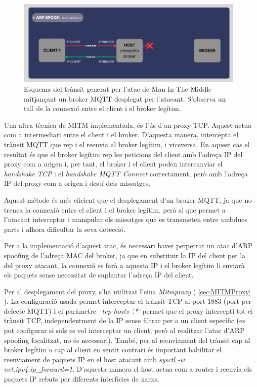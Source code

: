   \begin{figure}[H]
    \centering
    \includegraphics[width=1\textwidth]{img/mitmbroker.png}
    \caption{Esquema del trànsit generat per l'atac de Man In The Middle mitjançant un broker MQTT desplegat per l'atacant. S'observa un tall de la connexió entre el client i el broker legítim.}
    \label{fig:MITMbroker}
  \end{figure}

Una altra tècnica de MITM implementada, és l'ús d'un proxy TCP. Aquest actua com a intermediari entre el client i el broker. D'aquesta manera, intercepta el trànsit MQTT que rep i el reenvia al broker legítim, i viceversa. En aquest cas el resultat és que el broker legítim rep les peticions del client amb l'adreça IP del proxy com a origen i, per tant, el broker i el client poden intercanviar el \textit{handshake TCP} i el \textit{handshake MQTT Connect} correctament, però amb l'adreça IP del proxy com a origen i destí dels missatges.

Aquest mètode és més eficient que el desplegament d'un broker MQTT, ja que no trenca la connexió entre el client i el broker legítim, però sí que permet a l'atacant interceptar i manipular els missatges que es transmeten entre ambdues parts i alhora dificultar la seva detecció. 

Per a la implementació d'aquest atac, és necessari haver perpetrat un atac d'ARP spoofing de l'adreça MAC del broker, ja que en substituir la IP del client per la del proxy atacant, la connexió es farà a aquesta IP i el broker legítim li enviarà els paquets sense necessitat de suplantar l'adreça IP del client.

Per al desplegament del proxy, s'ha utilitzat l'eina \textit{Mitmproxy} ( \ref{sec:MITMProxy} ). La configuració usada permet interceptar el trànsit TCP al port 1883 (port per defecte MQTT) i el paràmetre \textit{--tcp-hosts '.*'} permet que el proxy intercepti tot el trànsit TCP, independentment de la IP sense filtrar per a un client específic (es pot configurar si sols es vol interceptar un client, però al realitzar l'atac d'ARP spoofing focalitzat, no és necessari). També, per al reenviament del trànsit cap al broker legítim o cap al client en sentit contrari és important habilitar el reenviament de paquets IP en el host atacant amb \textit{sysctl -w net.ipv4.ip\_forward=1}. D'aquesta manera el host actua com a router i reenvia els paquets IP rebuts per diferents interfícies de xarxa.

